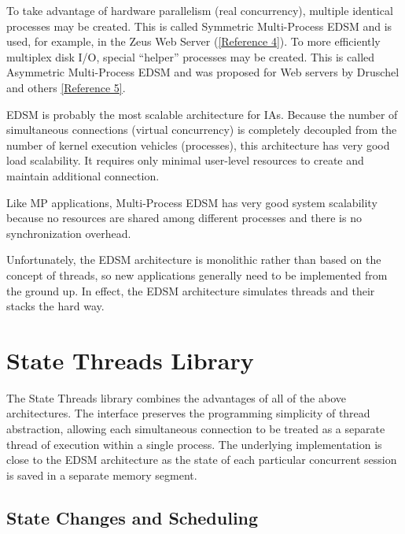 \documentclass[a4paper,12pt,notitlepage,twoside,openright]{article}
\begin{document}
To take advantage of hardware parallelism (real concurrency), multiple
identical processes may be created. This is called Symmetric
Multi-Process EDSM and is used, for example, in the Zeus Web Server
(\protect\hyperlink{refs4}{{[}Reference 4{]}}). To more efficiently
multiplex disk I/O, special ``helper'' processes may be created. This is
called Asymmetric Multi-Process EDSM and was proposed for Web servers by
Druschel and others \protect\hyperlink{refs5}{{[}Reference 5{]}}.

EDSM is probably the most scalable architecture for IAs. Because the
number of simultaneous connections (virtual concurrency) is completely
decoupled from the number of kernel execution vehicles (processes), this
architecture has very good load scalability. It requires only minimal
user-level resources to create and maintain additional connection.

Like MP applications, Multi-Process EDSM has very good system
scalability because no resources are shared among different processes
and there is no synchronization overhead.

Unfortunately, the EDSM architecture is monolithic rather than based on
the concept of threads, so new applications generally need to be
implemented from the ground up. In effect, the EDSM architecture
simulates threads and their stacks the hard way.

\protect\hypertarget{ST}{}{}

\hypertarget{state-threads-library}{%
\section{State Threads Library}\label{state-threads-library}}

The State Threads library combines the advantages of all of the above
architectures. The interface preserves the programming simplicity of
thread abstraction, allowing each simultaneous connection to be treated
as a separate thread of execution within a single process. The
underlying implementation is close to the EDSM architecture as the state
of each particular concurrent session is saved in a separate memory
segment.

\hypertarget{state-changes-and-scheduling}{%
\subsection{State Changes and
Scheduling}\label{state-changes-and-scheduling}}
\end{document}
